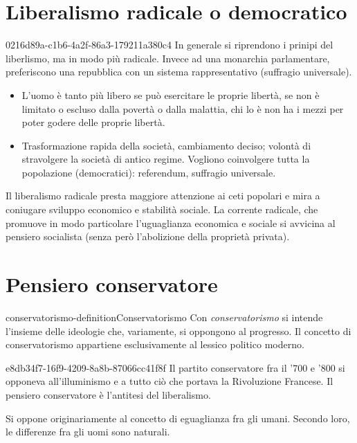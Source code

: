 \documentclass[preview]{standalone}
\begin{document}
\section{Liberalismo radicale o democratico}

\begin{snippet}{0216d89a-c1b6-4a2f-86a3-179211a380c4}
    In generale si riprendono i prinipi del liberlismo, ma in modo più radicale.
    Invece ad una monarchia parlamentare, preferiscono una repubblica con un sistema rappresentativo (suffragio universale).

    \begin{itemize}
        \item L'uomo è tanto più libero se può esercitare le proprie libertà, se non è limitato o escluso dalla povertà o dalla malattia, chi lo è non ha i mezzi per poter godere delle proprie libertà.
        \item Trasformazione rapida della società, cambiamento deciso; volontà di stravolgere la società di antico regime. Vogliono coinvolgere tutta la popolazione (democratici): referendum, suffragio universale.
    \end{itemize}

    Il liberalismo radicale presta maggiore attenzione ai ceti popolari e mira a coniugare sviluppo
    economico e stabilità sociale. La corrente radicale, che promuove in modo particolare
    l'uguaglianza economica e sociale si avvicina al pensiero socialista (senza però l'abolizione della
    proprietà privata).
\end{snippet}

\section{Pensiero conservatore}

\begin{snippetdefinition}{conservatorismo-definition}{Conservatorismo}
    Con \textit{conservatorismo} si intende l'insieme delle ideologie che, variamente, si oppongono al progresso. Il
    concetto di conservatorismo appartiene esclusivamente al lessico politico moderno.
\end{snippetdefinition}

\begin{snippet}{e8db34f7-16f9-4209-8a8b-87066cc41f8f}
    Il partito conservatore fra il '700 e '800 si opponeva all'illuminismo e a tutto ciò che portava la Rivoluzione Francese.
    Il pensiero conservatore è l'antitesi del liberalismo.

    Si oppone originariamente al concetto di eguaglianza fra gli umani. Secondo loro, le differenze fra gli uomi sono naturali.
\end{snippet}
\end{document}
